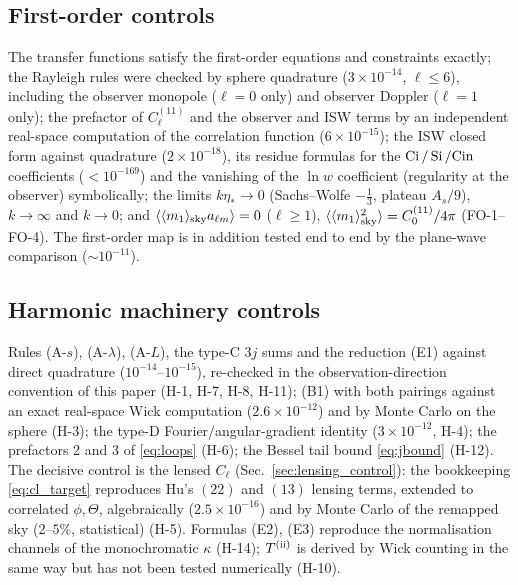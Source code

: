 \subsection{First-order controls}
\label{sec:check_first}
The transfer functions satisfy the first-order equations and constraints exactly; the Rayleigh rules were checked by sphere quadrature
($3\times10^{-14}$, $\ell\le6$), including the observer monopole ($\ell=0$ only) and observer Doppler ($\ell=1$ only); the prefactor of $C^{(11)}_\ell$ and the
observer and ISW terms by an independent real-space computation of the correlation function ($6\times10^{-15}$); the ISW closed form against
quadrature ($2\times10^{-18}$), its residue formulas for the $\operatorname{Ci}/\operatorname{Si}/\mathrm{Cin}$ coefficients ($<10^{-169}$) and the vanishing of the $\ln w$
coefficient (regularity at the observer) symbolically; the limits $k\eta_*\to0$ (Sachs--Wolfe $-\tfrac13$, plateau $A_s/9$), $k\to\infty$ and $k\to0$;
and $\langle\langle m_1\rangle_{\rm sky}a_{\ell m}\rangle=0$ ($\ell\ge1$), $\langle\langle m_1\rangle_{\rm sky}^2\rangle=C^{(11)}_0/4\pi$ (FO-1--FO-4).  The first-order map is in addition tested
end to end by the plane-wave comparison ($\sim10^{-11}$).

\subsection{Harmonic machinery controls}
\label{sec:check_harmonic}
Rules (A-$s$), (A-$\lambda$), (A-$L$), the type-C $3j$ sums and the reduction (E1) against direct quadrature ($10^{-14}$--$10^{-15}$), re-checked in the
observation-direction convention of this paper (H-1, H-7, H-8, H-11); (B1) with both pairings against an exact real-space Wick computation
($2.6\times10^{-12}$) and by Monte Carlo on the sphere (H-3); the type-D Fourier/angular-gradient identity ($3\times10^{-12}$, H-4); the prefactors 2 and 3
of \eqref{eq:loops} (H-6); the Bessel tail bound \eqref{eq:jbound} (H-12).  The decisive control is the lensed $C_\ell$ (Sec.~\ref{sec:lensing_control}):
the bookkeeping \eqref{eq:cl_target} reproduces Hu's $(22)$ and $(13)$ lensing terms, extended to correlated $\phi,\Theta$, algebraically
($2.5\times10^{-16}$) and by Monte Carlo of the remapped sky ($2$--$5\%$, statistical) (H-5).  Formulas (E2), (E3) reproduce the normalisation channels of the
monochromatic $\kappa$ (H-14); $T^{\rm(ii)}$ is derived by Wick counting in the same way but has not been tested numerically (H-10).

